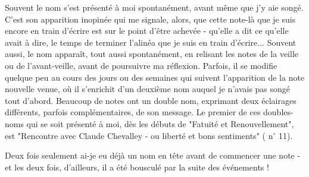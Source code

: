 Souvent le nom s'est présenté à moi spontanément, avant même que j'y aie songé. C’est son apparition inopinée qui me signale, alors, que cette note-là que je suis encore en train d'écrire est sur le point d'être achevée - qu'elle a dit ce qu'elle avait à dire, le temps de terminer l'alinéa que je suis en train d'écrire... Souvent aussi, le nom apparaît, tout aussi spontanément, en relisant les notes de la veille ou de l'avant-veille, avant de poursuivre ma réflexion. Parfois, il se modifie quelque peu au cours des jours ou des semaines qui suivent l'apparition de la note nouvelle venue, où il s'enrichit d'un deuxième nom auquel je n'avais pas songé tout d'abord. Beaucoup de notes ont un double nom, exprimant deux éclairages différents, parfois complémentaires, de son message. Le premier de ces doubles-noms qui se soit présenté à moi, dès les débuts de "Fatuité et Renouvellement", est "Rencontre avec Claude Chevalley - ou liberté et bons sentiments" ( $\mathrm{n}^{\circ}$ 11).

Deux fois seulement ai-je eu déjà un nom en tête avant de commencer une note - et les deux fois, d'ailleurs, il a été bousculé par la suite des événements !

